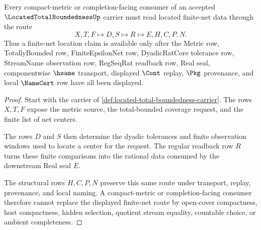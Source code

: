 \begin{theorem}
\label{thm:located-total-boundedness-finite-net-location-route}
Every compact-metric or completion-facing consumer of an accepted $\LocatedTotalBoundednessUp$ carrier must read located finite-net data through the route
$$
X,T,F \longmapsto D,S \longmapsto R \longmapsto E,H,C,P,N .
$$
Thus a finite-net location claim is available only after the Metric row, TotallyBounded row, FiniteEpsilonNet row, DyadicRatCore tolerance row, StreamName observation row, RegSeqRat readback row, Real seal, componentwise $\hsame$ transport, displayed $\Cont$ replay, $\Pkg$ provenance, and local $\NameCert$ row have all been displayed.
\end{theorem}
\begin{proof}
Start with the carrier of \autoref{def:located-total-boundedness-carrier}. The rows $X,T,F$ expose the metric source, the total-bounded coverage request, and the finite list of net centers.

The rows $D$ and $S$ then determine the dyadic tolerances and finite observation windows used to locate a center for the request. The regular readback row $R$ turns these finite comparisons into the rational data consumed by the downstream Real seal $E$.

The structural rows $H,C,P,N$ preserve this same route under transport, replay, provenance, and local naming. A compact-metric or completion-facing consumer therefore cannot replace the displayed finite-net route by open-cover compactness, host compactness, hidden selection, quotient stream equality, countable choice, or ambient completeness.
\end{proof}



